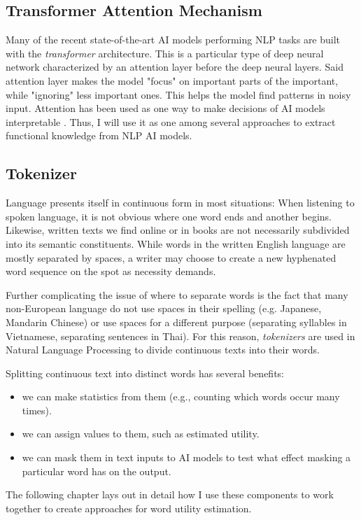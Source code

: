 	\subsection{Transformer Attention Mechanism}
	      Many of the recent state-of-the-art AI models performing NLP tasks are built with the \textit{transformer} architecture.
	      This is a particular type of deep neural network characterized by an attention layer before the deep neural layers.
	      Said attention layer makes the model "focus" on important parts of the important, while "ignoring" less important ones.
	      This helps the model find patterns in noisy input.
	      Attention has been used as one way to make decisions of AI models interpretable  .
	      Thus, I will use it as one among several approaches to extract functional knowledge from NLP AI models.

	\subsection{Tokenizer}
	      Language presents itself in continuous form in most situations:
	      When listening to spoken language, it is not obvious where one word ends and another begins.
	      Likewise, written texts we find online or in books are not necessarily subdivided into its semantic constituents.
	      While words in the written English language are mostly separated by spaces, a writer may choose to create a new hyphenated word sequence on the spot as necessity demands.

	      Further complicating the issue of where to separate words is the fact that many non-European language do not use spaces in their spelling (e.g. Japanese, Mandarin Chinese) or use spaces for a different purpose (separating syllables in Vietnamese, separating sentences in Thai).
		  For this reason, \textit{tokenizers} are used in Natural Language Processing to divide continuous texts into their words. 

	      Splitting continuous text into distinct words has several benefits:
	      \begin{itemize}
		      \item we can make statistics from them (e.g., counting which words occur many times).
		      \item we can assign values to them, such as estimated utility.
		      \item we can mask them in text inputs to AI models to test what effect masking a particular word has on the output.
	      \end{itemize}

The following chapter lays out in detail how I use these components to work together to create approaches for word utility estimation.
